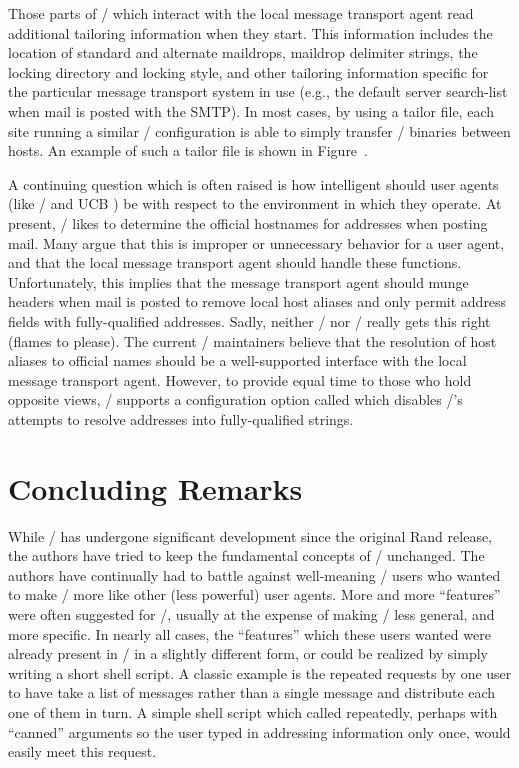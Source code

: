 Those parts of \MH/ which interact with the local message transport agent
read additional tailoring information when they start.%
This information includes
the location of standard and alternate maildrops,
maildrop delimiter strings,
the locking directory and locking style,
and other tailoring information specific for the particular
message transport system in use
(e.g., the default server search-list when mail is posted with the SMTP).
In most cases,
by using a tailor file,
each site running a similar \MH/ configuration is able to simply transfer
\MH/ binaries between hosts.
An example of such a tailor file is shown in Figure~\mtstailor.

A continuing question which is often raised is how intelligent should user
agents (like \MH/ and UCB \/) be with respect to the environment in
which they operate.
At present, \MH/ likes to determine 
the official hostnames for addresses when posting mail.
Many argue that this is improper or unnecessary behavior for a user agent,
and that the local message transport agent should handle these functions.
Unfortunately,
this implies that the message transport agent should munge headers when mail
is posted to remove local host aliases and only permit address fields with
fully-qualified addresses.
Sadly, neither \SendMail/ nor \MMDFII/ really gets this right
(flames to  please).
The current \MH/ maintainers believe that the resolution of host aliases to
official names should be a well-supported interface with the local message
transport agent.
However, to provide equal time to those who hold opposite views,
\MH/ supports a configuration option called  which disables \MH/'s
attempts to resolve addresses into fully-qualified strings.

\section{Concluding Remarks}			%
While \MH/ has undergone significant development since
the original
Rand release, the authors have
tried to keep the fundamental concepts of
\MH/ unchanged.
The authors have continually had to battle against
well-meaning \MH/ users who wanted to make \MH/
more like other (less powerful) user agents.
More and more ``features'' were often suggested for \MH/,
usually at the expense of making \MH/ less general, and more specific.
In nearly all cases, the ``features'' which these users wanted
were already present in \MH/ in a slightly different form,
or could be realized by simply writing a short shell script.
A classic example is the repeated requests by one user to have 
take a list of messages rather than a single message and distribute each one
of them in turn.
A simple shell script which called  repeatedly,
perhaps with ``canned'' arguments so the user typed in addressing information
only once, would easily meet this request.

